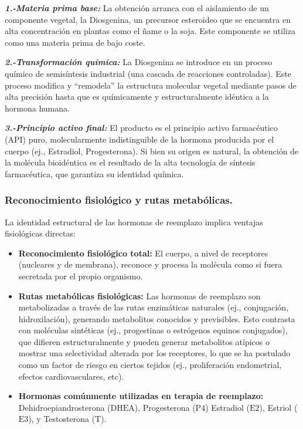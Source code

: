 \documentclass[
  spanish,
]{article}
\begin{document}
\textbf{\emph{1.-Materia prima base:}} La obtención arranca con el aislamiento de un componente vegetal, la Diosgenina, un precursor esteroideo que se encuentra en alta concentración en plantas como el ñame o la soja. Este componente se utiliza como una materia prima de bajo coste.

\textbf{\emph{2.-Transformación química:}} La Diosgenina se introduce en un proceso químico de semisíntesis industrial (una cascada de reacciones controladas). Este proceso modifica y ``remodela'' la estructura molecular vegetal mediante pasos de alta precisión hasta que es químicamente y estructuralmente idéntica a la hormona humana.

\textbf{\emph{3.-Principio activo final:}} El producto es el principio activo farmacéutico (API) puro, molecularmente indistinguible de la hormona producida por el cuerpo (ej., Estradiol, Progesterona). Si bien su origen es natural, la obtención de la molécula bioidéntica es el resultado de la alta tecnología de síntesis farmacéutica, que garantiza su identidad química.

\subsubsection{Reconocimiento fisiológico y rutas metabólicas.}\label{reconocimiento-fisioluxf3gico-y-rutas-metabuxf3licas.}

La identidad estructural de las hormonas de reemplazo implica ventajas fisiológicas directas:

\begin{itemize}
\item
  \textbf{Reconocimiento fisiológico total:} El cuerpo, a nivel de receptores (nucleares y de membrana), reconoce y procesa la molécula como si fuera secretada por el propio organismo.
\item
  \textbf{Rutas metabólicas fisiológicas:} Las hormonas de reemplazo son metabolizadas a través de las rutas enzimáticas naturales (ej., conjugación, hidroxilación), generando metabolitos conocidos y previsibles. Esto contrasta con moléculas sintéticas (ej., progestinas o estrógenos equinos conjugados), que difieren estructuralmente y pueden generar metabolitos atípicos o mostrar una selectividad alterada por los receptores, lo que se ha postulado como un factor de riesgo en ciertos tejidos (ej., proliferación endometrial, efectos cardiovasculares, etc).
\item
  \textbf{Hormonas comúnmente utilizadas en terapia de reemplazo:} Dehidroepiandrosterona (\(\text{DHEA}\)), Progesterona (\(\text{P4}\)) Estradiol (\(\text{E2}\)), Estriol (\(\text{E3}\)), y Testosterona (\(\text{T}\)).
\end{itemize}
\end{document}
